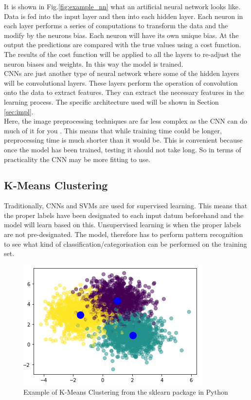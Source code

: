 \documentclass{article}
\begin{document}
    It is shown in Fig.\ref{fig:example_nn} what an artificial neural network looks like. Data is fed into the input layer and then into each hidden layer. Each neuron in each layer performs a series of computations to transform the data and the modify by the neurons bias. Each neuron will have its own unique bias. At the output the predictions are compared with the true values using a cost function. The results of the cost function will be applied to all the layers to re-adjust the neuron biases and weights. In this way the model is trained.\\
    CNNs are just another type of neural network where some of the hidden layers will be convolutional layers. These layers perform the operation of convolution onto the data to extract features. They can extract the necessary features in the learning process. The specific architecture used will be shown in Section \ref{sec:impl}.\\
    Here, the image preprocessing techniques are far less complex as the CNN can do much of it for you \cite{8942386}. This means that while training time could be longer, preprocessing time is much shorter than it would be. This is convenient because once the model has been trained, testing it should not take long. So in terms of practicality the CNN may be more fitting to use.
    \subsection{K-Means Clustering}
    Traditionally, CNNs and SVMs are used for supervised learning. This means that the proper labels have been designated to each input datum beforehand and the model will learn based on this. Unsupervised learning is when the proper labels are not pre-designated. The model, therefore has to perform pattern recognition to see what kind of classification/categorisation can be performed on the training set.\\
    \begin{figure}[htb]
    	\centering
    	\includegraphics[scale=0.7]{Figures/Example_KMeans.PNG}
    	\caption{Example of K-Means Clustering from the sklearn package in Python}
    	\label{fig:example_kmeans}
    \end{figure} 
\end{document}
